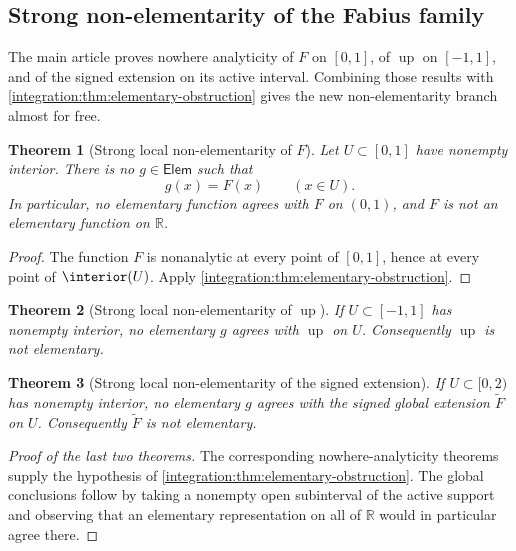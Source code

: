 \documentclass[11pt,oneside]{article}
\newtheorem{theorem}{Theorem}[section]
\theoremstyle{definition}
\theoremstyle{remark}
\newcommand{\R}{\mathbb R}
\newcommand{\Up}{\operatorname{up}}
\begin{document}
\subsection{Strong non-elementarity of the Fabius family}
\label{integration:sec:not-elementary}

The main article proves nowhere analyticity of $F$ on $[0,1]$, of $\Up$ on $[-1,1]$, and of
the signed extension on its active interval.  Combining those results with
\cref{integration:thm:elementary-obstruction} gives the new non-elementarity branch almost for free.

\begin{theorem}[Strong local non-elementarity of $F$]
\label{integration:thm:fabius-strong-non-elementary}
Let $U\subset[0,1]$ have nonempty interior.  There is no $g\in\mathsf{Elem}$ such that
\begin{equation}
 g(x)=F(x)\qquad(x\in U).
 \label{integration:eq:elementary-F-agreement}
\end{equation}
In particular, no elementary function agrees with $F$ on $(0,1)$, and $F$ is not an
elementary function on $\R$.
\end{theorem}

\begin{proof}
The function $F$ is nonanalytic at every point of $[0,1]$, hence at every point of
$\interior(U)$.  Apply \cref{integration:thm:elementary-obstruction}.
\end{proof}

\begin{theorem}[Strong local non-elementarity of $\Up$]
\label{integration:thm:up-strong-non-elementary}
If $U\subset[-1,1]$ has nonempty interior, no elementary $g$ agrees with $\Up$ on $U$.
Consequently $\Up$ is not elementary.
\end{theorem}

\begin{theorem}[Strong local non-elementarity of the signed extension]
\label{integration:thm:global-strong-non-elementary}
If $U\subset[0,2)$ has nonempty interior, no elementary $g$ agrees with the signed global
extension $\widetilde F$ on $U$.  Consequently $\widetilde F$ is not elementary.
\end{theorem}

\begin{proof}[Proof of the last two theorems]
The corresponding nowhere-analyticity theorems supply the hypothesis of
\cref{integration:thm:elementary-obstruction}.  The global conclusions follow by taking a nonempty open
subinterval of the active support and observing that an elementary representation on all of
$\R$ would in particular agree there.
\end{proof}
\end{document}
